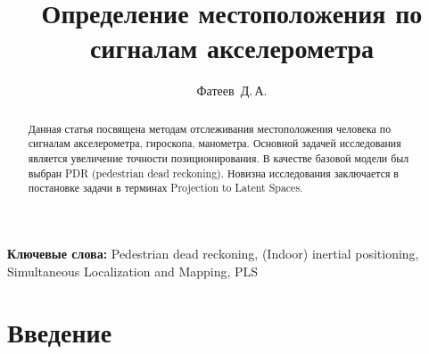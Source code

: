 \documentclass[12pt, a4paper]{article}
\begin{document}
\title{\textbf{Определение местоположения по сигналам акселерометра}}
\author{Фатеев~Д.\,А.}
\date{}
\maketitle


\begin{abstract}
	Данная статья посвящена методам отслеживания местоположения человека по сигналам акселерометра, гироскопа, манометра. Основной задачей исследования является увеличение точности позиционирования. В качестве базовой модели был выбран PDR (pedestrian dead reckoning). Новизна исследования заключается в постановке задачи в терминах Projection to Latent Spaces.

\end{abstract}

{\bf Ключевые слова:} Pedestrian dead reckoning, (Indoor) inertial positioning, Simultaneous Localization and Mapping, PLS

\setcounter{secnumdepth}{0}
\section{Введение}



\begin{thebibliography}{4}
\end{thebibliography}
\end{document}
